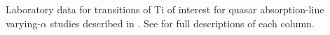 Laboratory data for transitions of Ti of interest for quasar absorption-line varying-$\alpha$ studies described in . See  for full descriptions of each column.
